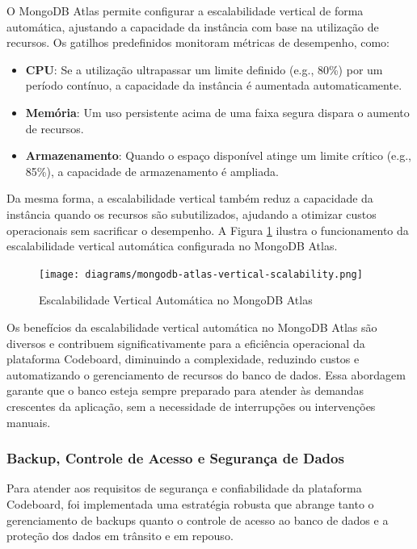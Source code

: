 O MongoDB Atlas permite configurar a escalabilidade vertical de forma automática, ajustando a capacidade da instância com base na utilização de recursos. Os gatilhos predefinidos monitoram métricas de desempenho, como:
\begin{itemize}
    \item \textbf{CPU}: Se a utilização ultrapassar um limite definido (e.g., 80\%) por um período contínuo, a capacidade da instância é aumentada automaticamente.
    \item \textbf{Memória}: Um uso persistente acima de uma faixa segura dispara o aumento de recursos.
    \item \textbf{Armazenamento}: Quando o espaço disponível atinge um limite crítico (e.g., 85\%), a capacidade de armazenamento é ampliada.
\end{itemize}


Da mesma forma, a escalabilidade vertical também reduz a capacidade da instância quando os recursos são subutilizados, ajudando a otimizar custos operacionais sem sacrificar o desempenho. A Figura \ref{fig:mongodb-atlas-vertical-scalability} ilustra o funcionamento da escalabilidade vertical automática configurada no MongoDB Atlas.

\begin{figure}[H]
    \centering
    \texttt{[image: diagrams/mongodb-atlas-vertical-scalability.png]}
    \caption{Escalabilidade Vertical Automática no MongoDB Atlas}
    \label{fig:mongodb-atlas-vertical-scalability}
\end{figure} 

Os benefícios da escalabilidade vertical automática no MongoDB Atlas são diversos e contribuem significativamente para a eficiência operacional da plataforma Codeboard, diminuindo a complexidade, reduzindo custos e automatizando o gerenciamento de recursos do banco de dados. Essa abordagem garante que o banco esteja sempre preparado para atender às demandas crescentes da aplicação, sem a necessidade de interrupções ou intervenções manuais.


\subsubsection{Backup, Controle de Acesso e Segurança de Dados}

Para atender aos requisitos de segurança e confiabilidade da plataforma Codeboard, foi implementada uma estratégia robusta que abrange tanto o gerenciamento de backups quanto o controle de acesso ao banco de dados e a proteção dos dados em trânsito e em repouso.

